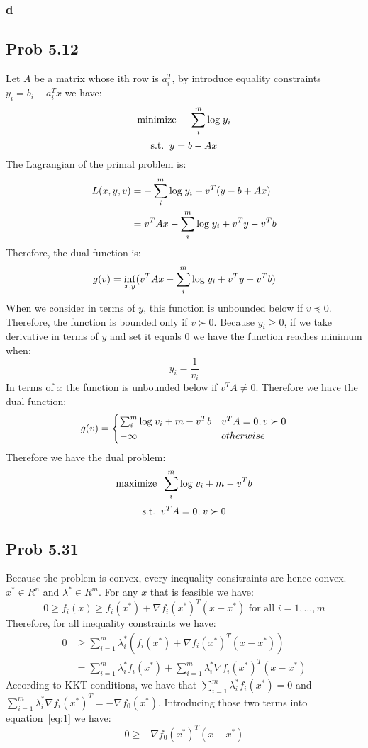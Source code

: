 \documentclass[10pt,a4paper]{article}
\begin{document}
\subsubsection{d}




\subsection{Prob 5.12}
Let $A$ be a matrix whose ith row is $a_i^T$, by introduce equality constraints $y_i=b_i-a_i^Tx$ we have:
$$
\text{minimize\;} -\sum_i^m\text{log\;}y_i
$$
$$
\text{s.t.\;\;} y=b-Ax
$$
The Lagrangian of the primal problem is:
\begin{align*}
  L(x,y,v) &= -\sum_i^m\text{log\;}y_i + v^T(y-b+Ax)\\
         &= v^TAx -\sum_i^m\text{log\;}y_i + v^Ty-v^Tb
\end{align*}
Therefore, the dual function is:
$$
g(v)=\inf_{x,y} (v^TAx -\sum_i^m\text{log\;}y_i + v^Ty-v^Tb)
$$
When we consider in terms of $y$, this function is unbounded
below if $v\preceq0$. Therefore, the function is bounded
only if $v\succ0$. Because $y_i\geq0$, if we take derivative
in terms of $y$ and set it equals $0$ we have the function
reaches minimum when:
$$
y_i=\frac{1}{v_i}
$$
In terms of $x$ the function is unbounded below if
$v^TA\neq0$. Therefore we have the dual function:
\begin{align*}
g(v)=
\begin{cases}
  \sum_i^m\text{log\;}v_i + m-v^Tb & v^TA=0, v\succ0\\
  -\infty &otherwise
\end{cases}
\end{align*}
Therefore we have the dual problem:
$$
\text{maximize\;\;}\sum_i^m\text{log\;}v_i + m-v^Tb 
$$
$$
\text{s.t.\;\;} v^TA=0\text{,\;} v\succ0
$$


\subsection{Prob 5.31}
Because the problem is convex, every inequality consitraints
are hence convex. $x^*\in R^n$ and $\lambda^*\in R^m$. For any $x$ that is feasible we have:
$$
0\geq f_i(x) \geq f_i(x^*) +\nabla f_i(x^*)^T(x-x^*)\text{ for
  all } i=1,\dots,m
$$
Therefore, for all inequality constraints we have:
\begin{align}
  0 &\geq \sum_{i=1}^m\lambda_i^*(f_i(x^*)+\nabla f_i(x^*)^T(x-x^*))\\
\label{eq:1}
&= \sum_{i=1}^m\lambda_i^*f_i(x^*)+\sum_{i=1}^m\lambda_i^*\nabla f_i(x^*)^T(x-x^*)
\end{align}
According to KKT conditions, we have that
$\sum_{i=1}^m\lambda_i^*f_i(x^*)=0$ and
$\sum_{i=1}^m\lambda_i^*\nabla f_i(x^*)^T=-\nabla f_0(x^*)$.
Introducing those two terms into equation~\ref{eq:1} we have:
$$
0\geq-\nabla f_0(x^*)^T(x-x^*)
$$


	\renewcommand\refname{Bibliography}
	
	
\end{document}
